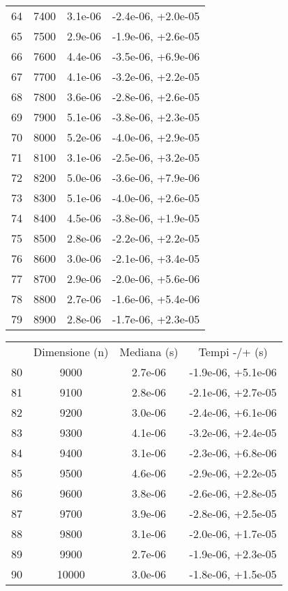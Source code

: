 \begin{table}
\begin{adjustbox}{width=1\textwidth/2}
\begin{tabular}{|c|c|c|c|}
\cline{1-4}
64 & 7400 & 3.1e-06 & -2.4e-06, +2.0e-05 \\
\cline{1-4}
65 & 7500 & 2.9e-06 & -1.9e-06, +2.6e-05 \\
\cline{1-4}
66 & 7600 & 4.4e-06 & -3.5e-06, +6.9e-06 \\
\cline{1-4}
67 & 7700 & 4.1e-06 & -3.2e-06, +2.2e-05 \\
\cline{1-4}
68 & 7800 & 3.6e-06 & -2.8e-06, +2.6e-05 \\
\cline{1-4}
69 & 7900 & 5.1e-06 & -3.8e-06, +2.3e-05 \\
\cline{1-4}
70 & 8000 & 5.2e-06 & -4.0e-06, +2.9e-05 \\
\cline{1-4}
71 & 8100 & 3.1e-06 & -2.5e-06, +3.2e-05 \\
\cline{1-4}
72 & 8200 & 5.0e-06 & -3.6e-06, +7.9e-06 \\
\cline{1-4}
73 & 8300 & 5.1e-06 & -4.0e-06, +2.6e-05 \\
\cline{1-4}
74 & 8400 & 4.5e-06 & -3.8e-06, +1.9e-05 \\
\cline{1-4}
75 & 8500 & 2.8e-06 & -2.2e-06, +2.2e-05 \\
\cline{1-4}
76 & 8600 & 3.0e-06 & -2.1e-06, +3.4e-05 \\
\cline{1-4}
77 & 8700 & 2.9e-06 & -2.0e-06, +5.6e-06 \\
\cline{1-4}
78 & 8800 & 2.7e-06 & -1.6e-06, +5.4e-06 \\
\cline{1-4}
79 & 8900 & 2.8e-06 & -1.7e-06, +2.3e-05 \\
\cline{1-4}
\end{tabular}
\end{adjustbox}
\end{table}

\begin{table}
\centering
\begin{adjustbox}{width=1\textwidth/2}
\begin{tabular}{|c|c|c|c|}
\hline
 & Dimensione (n) & Mediana (s) & Tempi -/+ (s) \\
80 & 9000 & 2.7e-06 & -1.9e-06, +5.1e-06 \\
\cline{1-4}
81 & 9100 & 2.8e-06 & -2.1e-06, +2.7e-05 \\
\cline{1-4}
82 & 9200 & 3.0e-06 & -2.4e-06, +6.1e-06 \\
\cline{1-4}
83 & 9300 & 4.1e-06 & -3.2e-06, +2.4e-05 \\
\cline{1-4}
84 & 9400 & 3.1e-06 & -2.3e-06, +6.8e-06 \\
\cline{1-4}
85 & 9500 & 4.6e-06 & -2.9e-06, +2.2e-05 \\
\cline{1-4}
86 & 9600 & 3.8e-06 & -2.6e-06, +2.8e-05 \\
\cline{1-4}
87 & 9700 & 3.9e-06 & -2.8e-06, +2.5e-05 \\
\cline{1-4}
88 & 9800 & 3.1e-06 & -2.0e-06, +1.7e-05 \\
\cline{1-4}
89 & 9900 & 2.7e-06 & -1.9e-06, +2.3e-05 \\
\cline{1-4}
90 & 10000 & 3.0e-06 & -1.8e-06, +1.5e-05 \\
\cline{1-4}
\end{tabular}
\end{adjustbox}
\end{table}

